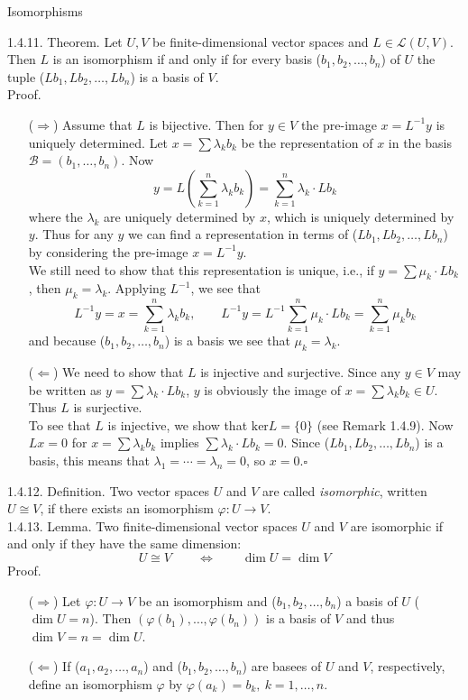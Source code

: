 \documentclass[smaller,hyperref={CJKbookmarks=true}]{beamer}
\newcommand{\myseries}[2]{$#1_1,#1_2,\dots,#1_#2$}
\begin{document}
\begin{frame}{Isomorphisms}
\begin{spacing}{1.1}
\alert{1.4.11. Theorem.} Let $U,V$ be finite-dimensional vector spaces and $L\in\mathcal{L}(U,V)$. Then $L$ is an isomorphism if and only if for every basis (\myseries{b}{n}) of $U$ the tuple (\myseries{Lb}{n}) is a basis of $V$.\\
\alert{Proof.}\\
\begin{itemize}
  \item[($\Rightarrow$)] Assume that $L$ is bijective. Then for $y\in V$ the pre-image $x=L^{-1}y$ is uniquely determined. Let $x=\sum\lambda_kb_k$ be the representation of $x$ in the basis $\mathcal{B}=(b_1,\ldots,b_n)$. Now
      \[y=L\left(\sum_{k=1}^{n}\lambda_kb_k\right)=\sum_{k=1}^{n}\lambda_k\cdot Lb_k\]
      where the $\lambda_k$ are uniquely determined by $x$, which is uniquely determined by $y$. Thus for any $y$ we can find a representation in terms of (\myseries{Lb}{n}) by considering the pre-image $x=L^{-1}y$.\\
      We still need to show that this representation is unique, i.e., if $y=\sum\mu_k\cdot Lb_k$, then $\mu_k=\lambda_k$. Applying $L^{-1}$, we see that
      \[L^{-1}y=x=\sum_{k=1}^{n}\lambda_kb_k,\qquad
      L^{-1}y=L^{-1}\sum_{k=1}^{n}\mu_k\cdot Lb_k=\sum_{k=1}^{n}\mu_kb_k\]
      and because (\myseries{b}{n}) is a basis we see that $\mu_k=\lambda_k$.
  \item[($\Leftarrow$)] We need to show that $L$ is injective and surjective. Since any $y\in V$ may be written as $y=\sum\lambda_k\cdot Lb_k$, $y$ is obviously the image of $x=\sum\lambda_kb_k\in U$. Thus $L$ is surjective.\\
      To see that $L$ is injective, we show that $\text{ker}L=\{0\}$ (see Remark 1.4.9). Now $Lx=0$ for $x=\sum\lambda_kb_k$ implies $\sum\lambda_k\cdot Lb_k=0$. Since (\myseries{Lb}{n}) is a basis, this means that $\lambda_1=\cdots=\lambda_n=0$, so $x=0$.$\square$
\end{itemize}
\newpage
\alert{1.4.12. Definition.} Two vector spaces $U$ and $V$ are called \emph{isomorphic}, written $U\cong V$, if there exists an isomorphism $\varphi:U\to V$.\\[10pt]
\alert{1.4.13. Lemma.} Two finite-dimensional vector spaces $U$ and $V$ are isomorphic if and only if they have the same dimension:
\[U\cong V\qquad\Leftrightarrow\qquad\dim U=\dim V\]
\alert{Proof.}\\
\begin{itemize}
  \item[($\Rightarrow$)] Let $\varphi:U\to V$ be an isomorphism and (\myseries{b}{n}) a basis of $U$ ($\dim U=n$). Then $(\varphi(b_1),\ldots,\varphi(b_n))$ is a basis of $V$ and thus $\dim V=n=\dim U$.
  \item[($\Leftarrow$)] If (\myseries{a}{n}) and (\myseries{b}{n}) are basees of $U$ and $V$, respectively, define an isomorphism $\varphi$ by $\varphi(a_k)=b_k,~k=1,\ldots,n$.
\end{itemize}
\end{spacing}
\end{frame}
\end{document}
